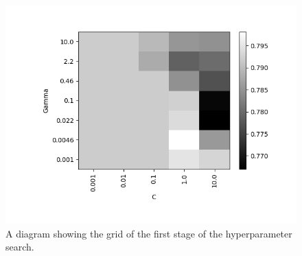 \documentclass[12pt,a4paper,twoside,openright]{report}
\begin{document}
\begin{figure}
	\begin{center}
		\includegraphics[scale=0.8]{figs/hyperparamgrid.png}
	\end{center}
	\caption{A diagram showing the grid of the first stage of the hyperparameter search.}
	\label{fig:hyperparamgrid}
\end{figure}
\end{document}
